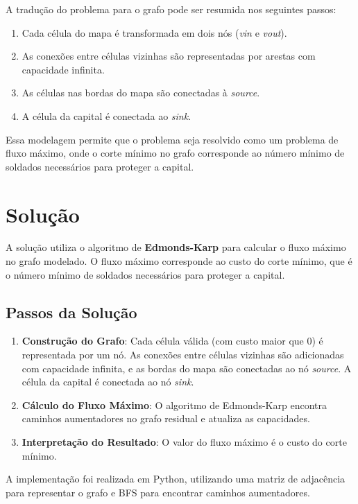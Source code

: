 \documentclass[a4paper,12pt]{article}
\begin{document}
A tradução do problema para o grafo pode ser resumida nos seguintes passos:
\begin{enumerate}
    \item Cada célula do mapa é transformada em dois nós (\textit{vin} e \textit{vout}).
    \item As conexões entre células vizinhas são representadas por arestas com capacidade
          infinita.
    \item As células nas bordas do mapa são conectadas à \textit{source}.
    \item A célula da capital é conectada ao \textit{sink}.
\end{enumerate}

Essa modelagem permite que o problema seja resolvido como um problema de fluxo
máximo, onde o corte mínimo no grafo corresponde ao número mínimo de soldados
necessários para proteger a capital.

\section*{Solução}

A solução utiliza o algoritmo de \textbf{Edmonds-Karp} para calcular o fluxo máximo no grafo modelado. O fluxo máximo corresponde ao custo do corte mínimo, que é o número mínimo de soldados necessários para proteger a capital.

\subsection*{Passos da Solução}

\begin{enumerate}
    \item \textbf{Construção do Grafo}: Cada célula válida (com custo maior que 0) é representada por um nó. As conexões entre células vizinhas são adicionadas com capacidade infinita, e as bordas do mapa são conectadas ao nó \textit{source}. A célula da capital é conectada ao nó \textit{sink}.
    \item \textbf{Cálculo do Fluxo Máximo}: O algoritmo de Edmonds-Karp encontra caminhos aumentadores no grafo residual e atualiza as capacidades.
    \item \textbf{Interpretação do Resultado}: O valor do fluxo máximo é o custo do corte mínimo.
\end{enumerate}

A implementação foi realizada em Python, utilizando uma matriz de adjacência para representar o grafo e BFS para encontrar caminhos aumentadores.
\end{document}
